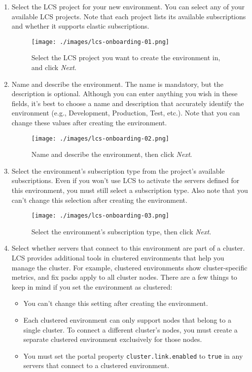 \begin{enumerate}
\def\labelenumi{\arabic{enumi}.}
\item
  Select the LCS project for your new environment. You can select any of
  your available LCS projects. Note that each project lists its
  available subscriptions and whether it supports elastic subscriptions.

  \begin{figure}
  \centering
  \texttt{[image: ./images/lcs-onboarding-01.png]}
  \caption{Select the LCS project you want to create the environment in,
  and click \emph{Next}.}
  \end{figure}
\item
  Name and describe the environment. The name is mandatory, but the
  description is optional. Although you can enter anything you wish in
  these fields, it's best to choose a name and description that
  accurately identify the environment (e.g., Development, Production,
  Test, etc.). Note that you can change these values after creating the
  environment.

  \begin{figure}
  \centering
  \texttt{[image: ./images/lcs-onboarding-02.png]}
  \caption{Name and describe the environment, then click \emph{Next}.}
  \end{figure}
\item
  Select the environment's subscription type from the project's
  available subscriptions. Even if you won't use LCS to activate the
  servers defined for this environment, you must still select a
  subscription type. Also note that you can't change this selection
  after creating the environment.

  \begin{figure}
  \centering
  \texttt{[image: ./images/lcs-onboarding-03.png]}
  \caption{Select the environment's subscription type, then click
  \emph{Next}.}
  \end{figure}
\item
  Select whether servers that connect to this environment are part of a
  cluster. LCS provides additional tools in clustered environments that
  help you manage the cluster. For example, clustered environments show
  cluster-specific metrics, and fix packs apply to all cluster nodes.
  There are a few things to keep in mind if you set the environment as
  clustered:

  \begin{itemize}
  \tightlist
  \item
    You can't change this setting after creating the environment.
  \item
    Each clustered environment can only support nodes that belong to a
    single cluster. To connect a different cluster's nodes, you must
    create a separate clustered environment exclusively for those nodes.
  \item
    You must set the portal property \texttt{cluster.link.enabled} to
    \texttt{true} in any servers that connect to a clustered
    environment.
  \end{itemize}


\end{enumerate}
